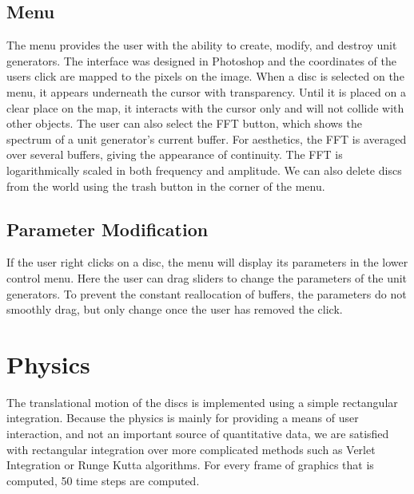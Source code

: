 \documentclass[pdftext,twoside,10pt]{article}
\begin{document}
\subsection{Menu}
The menu provides the user with the ability to create, modify, and destroy unit generators. The interface was designed in Photoshop and the coordinates of the users click are mapped to the pixels on the image. When a disc is selected on the menu, it appears underneath the cursor with transparency. Until it is placed on a clear place on the map, it interacts with the cursor only and will not collide with other objects. The user can also select the FFT button, which shows the spectrum of a unit generator's current buffer. For aesthetics, the FFT is averaged over several buffers, giving the appearance of continuity. The FFT is logarithmically scaled in both frequency and amplitude. We can also delete discs from the world using the trash button in the corner of the menu.

\subsection{Parameter Modification}
If the user right clicks on a disc, the menu will display its parameters in the lower control menu. Here the user can drag sliders to change the parameters of the unit generators. To prevent the constant reallocation of buffers, the parameters do not smoothly drag, but only change once the user has removed the click.

\section{Physics}
The translational motion of the discs is implemented using a simple rectangular integration. Because the physics is mainly for providing a means of user interaction, and not an important source of quantitative data, we are satisfied with rectangular integration over more complicated methods such as Verlet Integration or Runge Kutta algorithms. For every frame of graphics that is computed, 50 time steps are computed.
\end{document}
